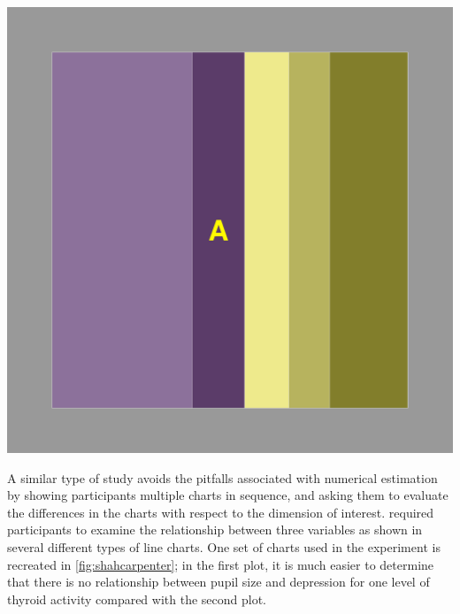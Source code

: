 \documentclass[letterpaper]{ar-1col}\usepackage[]{graphicx}\usepackage[]{color}
\begin{document}
\begin{minipage}{.4\textwidth}
\includegraphics[width=\textwidth]{figure/Oregon-spine_with_frame3.png}
\end{minipage}\hfill
\begin{minipage}{.5\textwidth}
\label{fig:framedspine}
\end{minipage}

A similar type of study avoids the pitfalls associated with numerical estimation by showing participants multiple charts in sequence, and asking them to evaluate the differences in the charts with respect to the dimension of interest. \citet{shahConceptualLimitationsComprehending1995} required participants to examine the relationship between three variables as shown in several different types of line charts. One set of charts used in the experiment is recreated in \autoref{fig:shahcarpenter}; in the first plot, it is much easier to determine that there is no relationship between pupil size and depression for one level of thyroid activity compared with the second plot.
\end{document}
